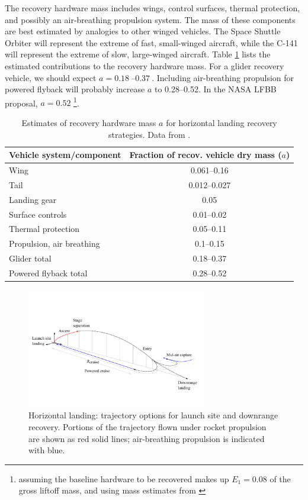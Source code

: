\documentclass[conf]{new-aiaa}
\begin{document}
The recovery hardware mass includes wings, control surfaces, thermal protection, and possibly an air-breathing propulsion system. The mass of these components are best estimated by analogies to other winged vehicles. The Space Shuttle Orbiter will represent the extreme of fast, small-winged aircraft, while the C-141 will represent the extreme of slow, large-winged aircraft. Table \ref{tab:winged_strategies} lists the estimated contributions to the recovery hardware mass. For a glider recovery vehicle, we should expect $a = \SIrange{0.18}{0.37}{}$. Including air-breathing propulsion for powered flyback will probably increase $a$ to \SIrange{0.28}{0.52}{}. In the NASA LFBB proposal, $a=0.52$ \footnote{assuming the baseline hardware to be recovered makes up $E_1=0.08$ of the gross liftoff mass, and using mass estimates from \cite{Healy1998}}.

\begin{table}
	\caption{\label{tab:winged_strategies} Estimates of recovery hardware mass $a$ for horizontal landing recovery strategies. Data from \cite{Sforza2015}.}
	\centering
	\begin{tabular}{l c}
		Vehicle system/component  & Fraction of recov. vehicle dry mass ($a$) \\
		\hline
		Wing                      & \SIrange{0.061}{0.16}{} \\
		Tail                      & \SIrange{0.012}{0.027}{}\\
		Landing gear              & 0.05 \\
		Surface controls          & \SIrange{0.01}{0.02}{} \\
		Thermal protection        & \SIrange{0.05}{0.11}{} \\
		Propulsion, air breathing & \SIrange{0.1}{0.15}{} \\
		\hline
		Glider total         & \SIrange{0.18}{0.37}{} \\
		Powered flyback total        & \SIrange{0.28}{0.52}{} \\
		\hline
	\end{tabular}
\end{table}


\begin{figure}[hbt!]
	\centering
	\includegraphics[width=0.7\textwidth]{figures/flyback_trajectory}
	\caption{\label{fig:flyback_trajectory} Horizontal landing: trajectory options for launch site and downrange recovery. Portions of the trajectory flown under rocket propulsion are shown as red solid lines; air-breathing propulsion is indicated with blue.}
\end{figure}
\end{document}
